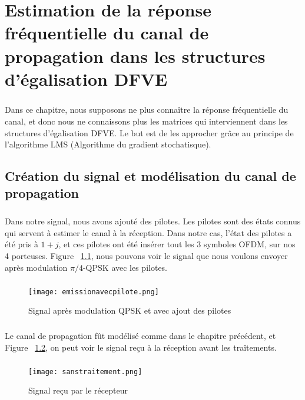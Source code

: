 \chapter{Estimation de la réponse fréquentielle du canal de propagation dans les structures d'égalisation DFVE}

\paragraph{}
Dans ce chapitre, nous supposons ne plus connaître la réponse fréquentielle du canal, et donc nous ne connaissons plus les matrices qui interviennent dans les structures d'égalisation DFVE. Le but est de les approcher grâce au principe de l'algorithme LMS (Algorithme du gradient stochatisque).

\section{Création du signal et modélisation du canal de propagation}
\paragraph{}
Dans notre signal, nous avons ajouté des pilotes. Les pilotes sont des états connus qui servent à estimer le canal à la réception. Dans notre cas, l'état des pilotes a été pris à $1+j$, et ces pilotes ont été insérer tout les 3 symboles OFDM, sur nos 4 porteuses. Figure ~\ref{etatavecpilotes}, nous pouvons voir le signal que nous voulons envoyer après modulation $\pi/4$-QPSK avec les pilotes. 
\paragraph{}
\vspace{1\baselineskip}
\begin{figure}[!h]
  \centering
  \texttt{[image: emissionavecpilote.png]}
  \caption{Signal après modulation QPSK et avec ajout des pilotes }
	\label{etatavecpilotes} 
\end{figure}
\vspace{10\baselineskip}

\paragraph{}
Le canal de propagation fût modélisé comme dans le chapitre précédent, et Figure ~\ref{sanstraitement}, on peut voir le signal reçu à la réception avant les traîtements.
\paragraph{}
\vspace{1\baselineskip}
\begin{figure}[!h]
  \centering
  \texttt{[image: sanstraitement.png]}
  \caption{Signal reçu par le récepteur}
	\label{sanstraitement} 
\end{figure}
\vspace{2\baselineskip}



